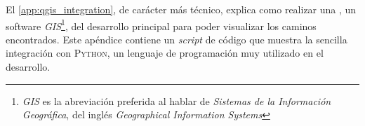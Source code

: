 	El \autoref{app:qgis_integration}, de carácter más técnico, explica como realizar una \textit{}, un software \textit{GIS}\footnote{\textit{GIS} es la abreviación preferida al hablar de \textit{Sistemas de la Información Geográfica}, del inglés \textit{Geographical Information Systems}}, del desarrollo principal para poder visualizar los caminos encontrados. Este apéndice contiene un \textit{script} de código que muestra la sencilla integración con \textsc{Python}, un lenguaje de programación muy utilizado en el desarrollo.